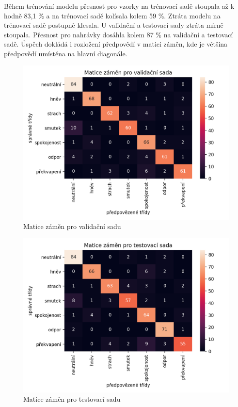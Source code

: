 \documentclass[FM,BP]{tulthesis}
\begin{document}
Během trénování modelu přesnost pro vzorky na trénovací sadě stoupala až k hodně 83,1 \% a na trénovací sadě kolísala kolem 59 \%. Ztráta modelu na trénovací sadě postupně klesala. U validační a testovací sady ztráta mírně stoupala. Přesnost pro nahrávky dosáhla kolem 87 \% na validační a testovací sadě. Úspěch dokládá i rozložení předpovědí v matici záměn, kde je většina předpovědí umístěna na hlavní diagonále.

\begin{figure}[!htbp]
\centerline{\includegraphics[scale=.5]{baseline-conf_matrix-val.png}}
\caption{Matice záměn pro validační sadu}
\label{fig}
\end{figure}
\FloatBarrier

\begin{figure}[!htbp]
\centerline{\includegraphics[scale=.5]{baseline-conf_matrix-test.png}}
\caption{Matice záměn pro testovací sadu}
\label{fig}
\end{figure}
\FloatBarrier
\end{document}
